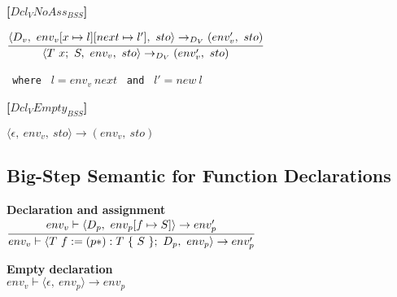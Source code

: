 \textbf{[$Dcl_V NoAss_{BSS}$]}\\
\begin{center}
	\begin{math}
	\cfrac
		{\langle D_v,\ env_v[x \mapsto l][next \mapsto l'],\ sto \rangle \rightarrow_{D_V} (env_v',\ sto)}
		{\langle T\ x;\ S,\ env_v,\ sto \rangle \rightarrow_{D_V} (env_v',\ sto)}
	\end{math}
	
	\texttt{ where } $l = env_v\ next$
	\texttt{ and } $l' = new\ l$
\end{center}

\textbf{[$Dcl_V Empty_{BSS}$]}\\
\begin{center}
	\begin{math}
	\langle \epsilon,\ env_v,\ sto \rangle \rightarrow (env_v,\ sto)
	\end{math}
\end{center}















\subsection{Big-Step Semantic for Function Declarations}
\textbf{Declaration and assignment}\\
\begin{math}
	\cfrac
		{env_v \vdash \langle D_p,\ env_p[f \mapsto S] \rangle \rightarrow env_p'}
		{env_v \vdash \langle T\ f := (p*): T\ \{\ S\ \};\ D_p,\ env_p \rangle \rightarrow env_p'} %
\end{math}

\textbf{Empty declaration}\\
\begin{math}
env_v \vdash \langle \epsilon,\ env_p \rangle \rightarrow env_p
\end{math}



